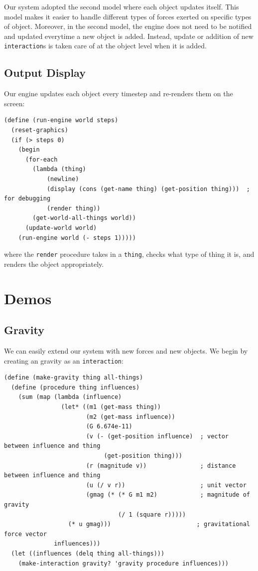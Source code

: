 \documentclass{article}
\begin{document}
Our system adopted the second model where each object updates itself. This
model makes it easier to handle different types of forces exerted on specific
types of object. Moreover, in the second model, the engine does not need to be
notified and updated everytime a new object is added. Instead, update or
addition of new \texttt{interaction}s is taken care of at the object level when
it is added.


\subsection{Output Display}

Our engine updates each object every timestep and re-renders them on the
screen:

\begin{verbatim}
(define (run-engine world steps)
  (reset-graphics)
  (if (> steps 0)
    (begin 
      (for-each 
        (lambda (thing)
            (newline)
            (display (cons (get-name thing) (get-position thing)))  ; for debugging
            (render thing))
        (get-world-all-things world))
      (update-world world)
    (run-engine world (- steps 1)))))
\end{verbatim}

where the \texttt{render} procedure takes in a \texttt{thing}, checks what type
of thing it is, and renders the object appropriately.

\section{Demos}
\subsection{Gravity}

We can easily extend our system with new forces and new objects. We begin by
creating an gravity as an \texttt{interaction}:

{\small\begin{verbatim}
(define (make-gravity thing all-things)
  (define (procedure thing influences)
    (sum (map (lambda (influence)
                (let* ((m1 (get-mass thing))
                       (m2 (get-mass influence))
                       (G 6.674e-11)
                       (v (- (get-position influence)  ; vector between influence and thing
                            (get-position thing)))
                       (r (magnitude v))               ; distance between influence and thing
                       (u (/ v r))                     ; unit vector
                       (gmag (* (* G m1 m2)            ; magnitude of gravity
                                (/ 1 (square r)))))
                  (* u gmag)))                        ; gravitational force vector
              influences)))
  (let ((influences (delq thing all-things)))
    (make-interaction gravity? 'gravity procedure influences)))
\end{verbatim}}
\end{document}
